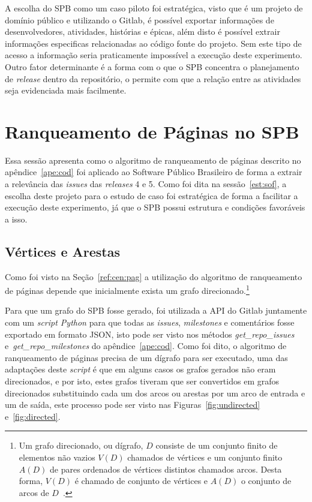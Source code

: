 A escolha do SPB como um caso piloto foi estratégica, visto que é um projeto de domínio público e utilizando o Gitlab, é possível exportar informações de desenvolvedores, atividades, histórias e épicas, além disto é possível extrair informações especificas relacionadas ao código fonte do projeto. Sem este tipo de acesso a informação seria praticamente impossível a execução deste experimento. Outro fator determinante é a forma com o que o SPB concentra o planejamento de \textit{release} dentro da repositório, o permite com que a relação entre as atividades seja evidenciada mais facilmente.

\section{Ranqueamento de Páginas no SPB}
\label{est:ran}

Essa sessão apresenta como o algoritmo de ranqueamento de páginas descrito no apêndice~\ref{ape:cod} foi aplicado ao Software Público Brasileiro de forma a extrair a relevância das \textit{issues} das \textit{releases} 4 e 5. Como foi dita na sessão~\ref{est:sof}, a escolha deste projeto para o estudo de caso foi estratégica de forma a facilitar a execução deste experimento, já que o SPB possui  estrutura e condições favoráveis a isso.

\subsection{Vértices e Arestas}
\label{est:ran:ver}

Como foi visto na Seção~\ref{ref:cen:pag} a utilização do algoritmo de ranqueamento de páginas depende que inicialmente exista um grafo direcionado.\footnote{Um grafo direcionado, ou dígrafo, $D$ consiste de um conjunto finito de elementos não vazios $V(D)$ chamados de vértices e um conjunto finito $A(D)$ de pares ordenados de vértices distintos chamados arcos. Desta forma, $V(D)$ é chamado de conjunto de vértices e $A(D)$ o conjunto de arcos de $D$~\cite{bang}.}

Para que um grafo do SPB fosse gerado, foi utilizada a API do Gitlab juntamente com um \textit{script Python} para que todas as \textit{issues}, \textit{milestones} e comentários fosse exportado em formato JSON, isto pode ser visto nos métodos \textit{get\_repo\_issues} e~\textit{get\_repo\_milestones} do apêndice~\ref{ape:cod}. Como foi dito, o algoritmo de ranqueamento de páginas precisa de um dígrafo para ser executado, uma das adaptações deste \textit{script} é que em alguns casos os grafos gerados não eram direcionados, e por isto, estes grafos tiveram que ser convertidos em grafos direcionados substituindo cada um dos arcos ou arestas por um arco de entrada e um de saída, este processo pode ser visto nas Figuras~\ref{fig:undirected} e~\ref{fig:directed}.

